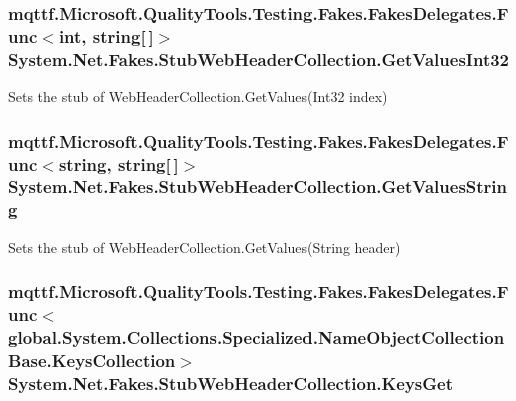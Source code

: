 \hypertarget{class_system_1_1_net_1_1_fakes_1_1_stub_web_header_collection_ad4c9c84b1b67a0ef840e87ea891999bd}{
\subsubsection[{Get\-Values\-Int32}]{\setlength{\rightskip}{0pt plus 5cm}mqttf.\-Microsoft.\-Quality\-Tools.\-Testing.\-Fakes.\-Fakes\-Delegates.\-Func$<$int, string\mbox{[}$\,$\mbox{]}$>$ System.\-Net.\-Fakes.\-Stub\-Web\-Header\-Collection.\-Get\-Values\-Int32}}\label{class_system_1_1_net_1_1_fakes_1_1_stub_web_header_collection_ad4c9c84b1b67a0ef840e87ea891999bd}


Sets the stub of Web\-Header\-Collection.\-Get\-Values(\-Int32 index)

\hypertarget{class_system_1_1_net_1_1_fakes_1_1_stub_web_header_collection_a24b5044ac805b2607591b0fc4e617426}{
\subsubsection[{Get\-Values\-String}]{\setlength{\rightskip}{0pt plus 5cm}mqttf.\-Microsoft.\-Quality\-Tools.\-Testing.\-Fakes.\-Fakes\-Delegates.\-Func$<$string, string\mbox{[}$\,$\mbox{]}$>$ System.\-Net.\-Fakes.\-Stub\-Web\-Header\-Collection.\-Get\-Values\-String}}\label{class_system_1_1_net_1_1_fakes_1_1_stub_web_header_collection_a24b5044ac805b2607591b0fc4e617426}


Sets the stub of Web\-Header\-Collection.\-Get\-Values(\-String header)

\hypertarget{class_system_1_1_net_1_1_fakes_1_1_stub_web_header_collection_a5da846ff387eb3d719e1c4038734060b}{
\subsubsection[{Keys\-Get}]{\setlength{\rightskip}{0pt plus 5cm}mqttf.\-Microsoft.\-Quality\-Tools.\-Testing.\-Fakes.\-Fakes\-Delegates.\-Func$<$global.\-System.\-Collections.\-Specialized.\-Name\-Object\-Collection\-Base.\-Keys\-Collection$>$ System.\-Net.\-Fakes.\-Stub\-Web\-Header\-Collection.\-Keys\-Get}}\label{class_system_1_1_net_1_1_fakes_1_1_stub_web_header_collection_a5da846ff387eb3d719e1c4038734060b}


